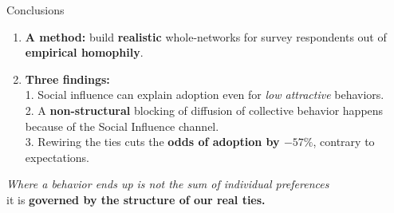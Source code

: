 \documentclass[aspectratio=169,11pt]{beamer}
\newcommand{\emphr}[1]{{\color{ndreddark}\textbf{#1}}}
\begin{document}
\begin{frame}{Conclusions}
\begin{enumerate}
  \item \textbf{A method:} build \emphr{realistic} whole-networks for survey
        respondents out of \emphr{empirical homophily}.
  \vspace{0.15cm}
  \item \textbf{Three findings:} \\
  \hspace{0.5cm} 1. Social influence can explain adoption even for \emph{low attractive} behaviors. \\
  \hspace{0.5cm} 2. A \emphr{non-structural} blocking of diffusion of collective behavior happens because of the Social Influence channel. \\
  \hspace{0.5cm} 3. Rewiring the ties cuts the \emphr{odds of adoption by $-57\%$}, contrary to expectations.
\end{enumerate}
\vspace{0.3cm}
\begin{center}\small
\emph{Where a behavior ends up is not the sum of individual preferences}\\
it is \emphr{governed by the structure of our real ties.}
\end{center}
\end{frame}
\end{document}
